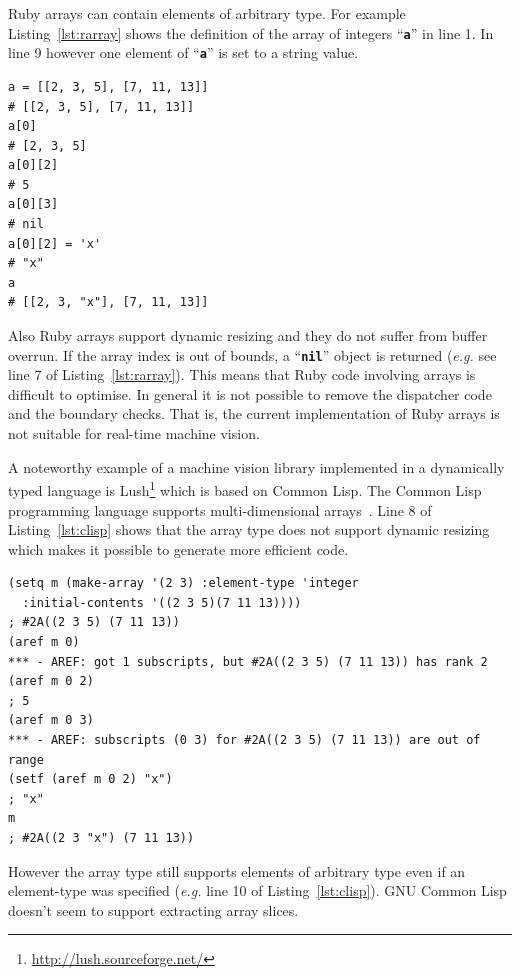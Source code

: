 \documentclass[12pt,a4paper,oneside,openright]{book}
\newcommand{\eg}{\emph{e.g.} }
\newcommand{\Eg}{For ex\-am\-ple }
\newcommand{\Ie}{That is, }
\newcommand{\lst}[1]{Listing~\ref{lst:#1}}
\newcommand{\code}[1]{``\texttt{\textbf{\textcolor{codegray}{\small{#1}}}}''}
\newcommand{\rubyout}{Comment lines (preceded with ``\#'') show the output of the program}
\newcommand{\lispout}{Comment lines (preceded with ``;'') show the output of the program}
\begin{document}
\begin{CJK}{UTF8}{}
Ruby arrays can contain elements of arbitrary type. \Eg \lst{rarray} shows the definition of the array of integers \code{a} in line 1. In line 9 however one element of \code{a} is set to a string value.
\lstset{language=Ruby,frame=single,numbers=left}
\begin{lstlisting}[float=htbp,caption={Arrays in Ruby. \rubyout},label=lst:rarray]
a = [[2, 3, 5], [7, 11, 13]]
# [[2, 3, 5], [7, 11, 13]]
a[0]
# [2, 3, 5]
a[0][2]
# 5
a[0][3]
# nil
a[0][2] = 'x'
# "x"
a
# [[2, 3, "x"], [7, 11, 13]]
\end{lstlisting}
Also Ruby arrays support dynamic resizing and they do not suffer from buffer overrun. If the array index is out of bounds, a \code{nil} object is returned (\eg see line 7 of \lst{rarray}). This means that Ruby code involving arrays is difficult to optimise. In general it is not possible to remove the dispatcher code and the boundary checks. \Ie the current implementation of Ruby arrays is not suitable for real-time machine vision.

A noteworthy example of a machine vision library implemented in a dynamically typed language is Lush\footnote{\url{http://lush.sourceforge.net/}} which is based on Common Lisp. The Common Lisp programming language supports multi-dimensional arrays~\citep{graham1994lisp}. Line 8 of \lst{clisp} shows that the array type does not support dynamic resizing which makes it possible to generate more efficient code.
\lstset{language=Lisp,frame=single,numbers=left}
\begin{lstlisting}[float=htbp,caption={Arrays in \acs{GNU} Common Lisp. \lispout},label=lst:clisp]
(setq m (make-array '(2 3) :element-type 'integer
  :initial-contents '((2 3 5)(7 11 13))))
; #2A((2 3 5) (7 11 13))
(aref m 0)
*** - AREF: got 1 subscripts, but #2A((2 3 5) (7 11 13)) has rank 2
(aref m 0 2)
; 5
(aref m 0 3)
*** - AREF: subscripts (0 3) for #2A((2 3 5) (7 11 13)) are out of range
(setf (aref m 0 2) "x")
; "x"
m
; #2A((2 3 "x") (7 11 13))
\end{lstlisting}
However the array type still supports elements of arbitrary type even if an element-type was specified (\eg line 10 of \lst{clisp}). \acs{GNU} Common Lisp doesn't seem to support extracting array slices.


\end{CJK}
\end{document}
